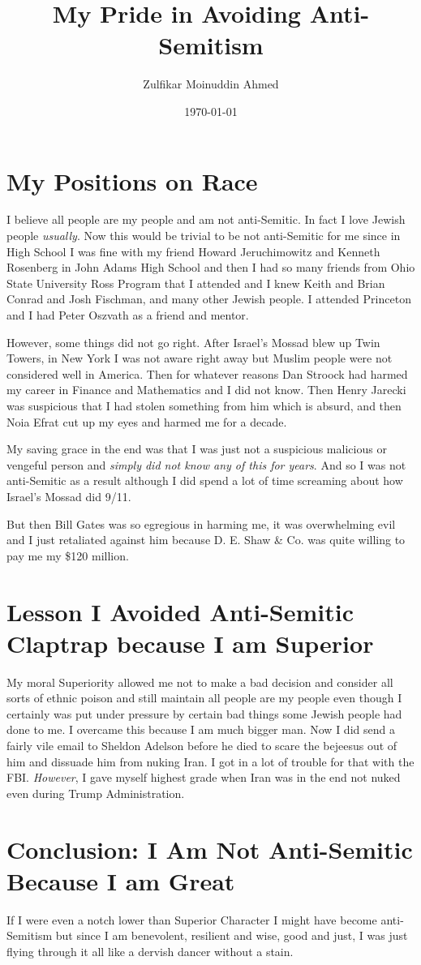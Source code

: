 \documentclass{amsart}
\title{My Pride in Avoiding Anti-Semitism}
\author{Zulfikar Moinuddin Ahmed}
\date{\today}
\begin{document}
\maketitle

\section{My Positions on Race}
I believe all people are my people and am not anti-Semitic.  In fact I love Jewish people {\em usually}.  Now this would be trivial to be not anti-Semitic for me since in High School I was fine with my friend Howard Jeruchimowitz and Kenneth Rosenberg in John Adams High School and then I had so many friends from Ohio State University Ross Program that I attended and I knew Keith and Brian Conrad and Josh Fischman, and many other Jewish people.  I attended Princeton and I had Peter Oszvath as a friend and mentor.  

However, some things did not go right.  After Israel's Mossad blew up Twin Towers, in New York I was not aware right away but Muslim people were not considered well in America.  Then for whatever reasons Dan Stroock had harmed my career in Finance and Mathematics and I did not know.  Then Henry Jarecki was suspicious that I had stolen something from him which is absurd, and then Noia Efrat cut up my eyes and harmed me for a decade.  

My saving grace in the end was that I was just not a suspicious malicious or vengeful person and {\em simply did not know any of this for years}.  And so I was not anti-Semitic as a result although I did spend a lot of time screaming about how Israel's Mossad did 9/11.  

But then Bill Gates was so egregious in harming me, it was overwhelming evil and I just retaliated against him because D. E. Shaw \& Co. was quite willing to pay me my \$120 million.  

\section{Lesson I Avoided Anti-Semitic Claptrap because I am Superior}

My moral Superiority allowed me not to make a bad decision and consider all sorts of ethnic poison and still maintain all people are my people even though I certainly was put under pressure by certain bad things some Jewish people had done to me.  I overcame this because I am much bigger man.  Now I did send a fairly vile email to Sheldon Adelson before he died to scare the bejeesus out of him and dissuade him from nuking Iran.  I got in a lot of trouble for that with the FBI.  {\em However}, I gave myself highest grade when Iran was in the end not nuked even during Trump Administration.  

\section{Conclusion: I Am Not Anti-Semitic Because I am Great}

If I were even a notch lower than Superior Character I might have become anti-Semitism but since I am benevolent, resilient and wise, good and just, I was just flying through it all like a dervish dancer without a stain.
\end{document}
